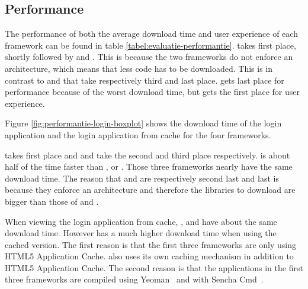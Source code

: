 \documentclass[a4paper]{artikel3}
\newcommand{\setspace}[0]{\vspace{2mm}}
\renewcommand{\paragraph}[1]{\setspace \noindent {\bf #1}  }
\begin{document}
\subsection{Performance} %
\label{sec:evaluation-performance}
The performance of both the average download time and user experience of each framework can be found in table \ref{tabel:evaluatie-performantie}.
\lungo{} takes first place, shortly followed by \jqma{} and \sta{}.
This is because the two frameworks do not enforce an architecture, which means that less \js{} code has to be downloaded.
This is in contrast to \kendoa{} and \sta{} that take respectively third  and last place.
\sta{} gets last place for performance because of the worst download time, but gets the first place for user experience.


\paragraph{Average download time}
Figure \ref{fig:performantie-login-boxplot} shows the download time of the login application and the login application from cache for the four frameworks. 

\lungo{} takes first place and \jqma{} and \kendoa{} take the second and third place respectively.
\lungo{} is about half of the time faster than \jqma{}, \kendoa{} or \sta{}.
Those three frameworks nearly have the same download time.
The reason that \kendoa{} and \sta{} are respectively second last and last is because they enforce an architecture and therefore the libraries to download are bigger than those of \lungo{} and \jqma{}.

When viewing the login application from cache, \kendoa{}, \jqma{} and \lungo{} have about the same download time.
However \st{} has a much higher download time when using the cached version.
The first reason is that the first three frameworks are only using HTML5 Application Cache.
\sta{} also uses its own caching mechanism in addition to HTML5 Application Cache.
The second reason is that the applications in the first three frameworks are compiled using Yeoman~\cite{Yeoman2013} and \st{} with Sencha Cmd~\cite{Sencha2012}.

\end{document}
